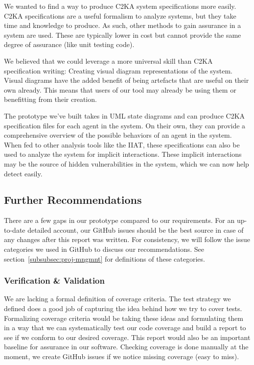 We wanted to find a way to produce C2KA system specifications more easily.
C2KA specifications are a useful formalism to analyze systems, but they take time and knowledge to produce.
As such, other methods to gain assurance in a system are used.
These are typically lower in cost but cannot provide the same degree of assurance (like unit testing code).

We believed that we could leverage a more universal skill than C2KA specification writing:
Creating visual diagram representations of the system.
Visual diagrams have the added benefit of being artefacts that are useful on their own already.
This means that users of our tool may already be using them or benefitting from their creation.

The prototype we've built takes in UML state diagrams and can produce C2KA specification files for each agent in the system.
On their own, they can provide a comprehensive overview of the possible behaviors of an agent in the system.
When fed to other analysis tools like the IIAT,
these specifications can also be used to analyze the system for implicit interactions.
These implicit interactions may be the source of hidden vulnerabilities in the system,
which we can now help detect easily.

\subsection{Further Recommendations}\label{subsec:further-recommendations}
There are a few gaps in our prototype compared to our requirements.
For an up-to-date detailed account, our GitHub issues should be the best source in case of any changes after this report was written.
For consistency, we will follow the issue categories we used in GitHub to discuss our recommendations.
See section~\ref{subsubsec:proj-mngmnt} for definitions of these categories.

\subsubsection{Verification \& Validation}\label{subsubsec:rec-v-v}
We are lacking a formal definition of coverage criteria.
The test strategy we defined does a good job of capturing the idea behind how we try to cover tests.
Formalizing coverage criteria would be taking these ideas and formulating them in a way that we can systematically
test our code coverage and build a report to see if we conform to our desired coverage.
This report would also be an important baseline for assurance in our software.
Checking coverage is done manually at the moment, we create GitHub issues if we notice missing coverage (easy to miss).

